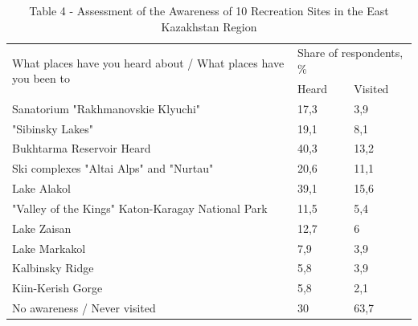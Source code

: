 \begin{table}[H]
\caption*{Table 4 - Assessment of the Awareness of 10 Recreation Sites in the East Kazakhstan Region}
\centering
\begin{tabular}{|l|ll|}
\hline
\multirow{2}{*}{What places have you heard about / What places have you been to} & \multicolumn{2}{l|}{Share of respondents, \%} \\ \cline{2-3} 
 & \multicolumn{1}{l|}{Heard} & Visited \\ \hline
Sanatorium "Rakhmanovskie Klyuchi" & \multicolumn{1}{l|}{17,3} & 3,9 \\ \hline
"Sibinsky Lakes" & \multicolumn{1}{l|}{19,1} & 8,1 \\ \hline
Bukhtarma Reservoir Heard & \multicolumn{1}{l|}{40,3} & 13,2 \\ \hline
Ski complexes "Altai Alps" and "Nurtau" & \multicolumn{1}{l|}{20,6} & 11,1 \\ \hline
Lake Alakol & \multicolumn{1}{l|}{39,1} & 15,6 \\ \hline
"Valley of the Kings" Katon-Karagay National Park & \multicolumn{1}{l|}{11,5} & 5,4 \\ \hline
Lake Zaisan & \multicolumn{1}{l|}{12,7} & 6 \\ \hline
Lake Markakol & \multicolumn{1}{l|}{7,9} & 3,9 \\ \hline
Kalbinsky Ridge & \multicolumn{1}{l|}{5,8} & 3,9 \\ \hline
Kiin-Kerish Gorge & \multicolumn{1}{l|}{5,8} & 2,1 \\ \hline
No awareness / Never visited & \multicolumn{1}{l|}{30} & 63,7 \\ \hline
\end{tabular}
\end{table}

